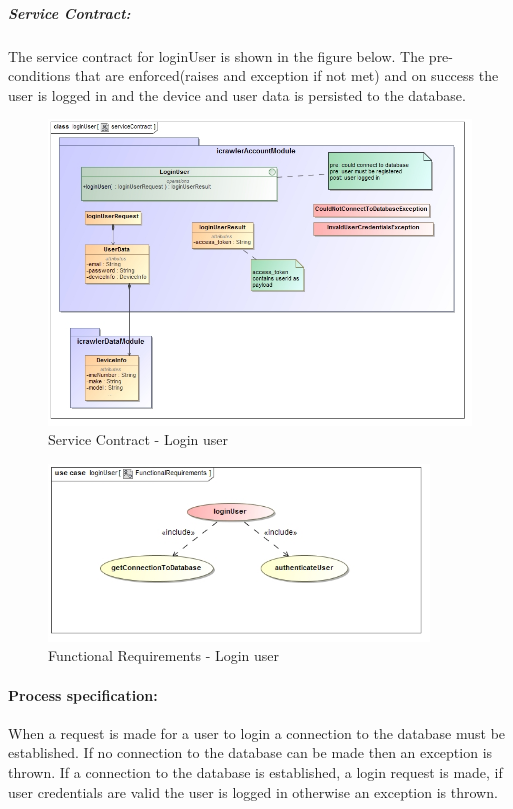 \documentclass[hidelinks, 12pt, oneside]{article}
\begin{document}
	\subparagraph{Service Contract:}
		The service contract for loginUser is shown in the figure below. The pre-conditions that are enforced(raises and exception if not met) and on success the user is logged in and the device and user data is persisted to the database.\newline 	
	
		\begin{figure}[!htbp]
    		\centering
    		\includegraphics[width=1.0\textwidth]{img/serviceContractLoginUser.jpg}
    		\caption{Service Contract - Login user}
    		\label{fig:ServiceCon_loginUser}
		\end{figure}
		
		
		\begin{figure}[!htbp]
    		\centering
    		\includegraphics[width=0.9\textwidth]{img/functionalRequirementsLoginUser.jpg}
    		\caption{Functional Requirements - Login user}
    		\label{fig:FunctionalReq_loginUser}
		\end{figure}
		
				
		\newpage
		\paragraph{Process specification:}
		When a request is made for a user to login a connection to the database must be established. If no connection to the database can be made then an exception is thrown. If a connection to the database is established, a login request is made, if user credentials are valid	the user is logged in otherwise an exception is thrown.		
		
\end{document}
